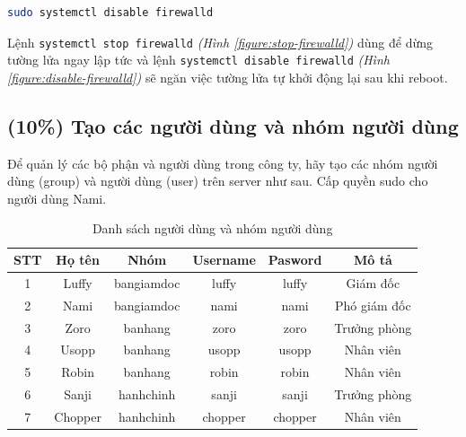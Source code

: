 \documentclass[a4paper, 11pt]{article}
\begin{document}
\begin{itemize}
          \begin{lstlisting}[language=bash, caption=Ngăn tường lửa tự khởi động lại]
sudo systemctl disable firewalld
\end{lstlisting}

          Lệnh \texttt{systemctl stop firewalld} \textit{(Hình \ref{figure:stop-firewalld})} dùng để dừng tường lửa ngay lập tức và lệnh \texttt{systemctl disable firewalld} \textit{(Hình \ref{figure:disable-firewalld})} sẽ ngăn việc tường lửa tự khởi động lại sau khi reboot.
\end{itemize}

\subsection{(10\%) Tạo các người dùng và nhóm người dùng}

Để quản lý các bộ phận và người dùng trong công ty, hãy tạo các nhóm người dùng (group) và người dùng (user) trên server như sau. Cấp quyền sudo cho người dùng Nami.

\begin{longtable}{|c|c|c|c|c|c|}
    \caption{Danh sách người dùng và nhóm người dùng}              \\
    \hline
    STT & Họ tên  & Nhóm       & Username & Pasword & Mô tả        \\
    \hline

    1   & Luffy   & bangiamdoc & luffy    & luffy   & Giám đốc     \\
    \hline

    2   & Nami    & bangiamdoc & nami     & nami    & Phó giám đốc \\
    \hline

    3   & Zoro    & banhang    & zoro     & zoro    & Trưởng phòng \\
    \hline

    4   & Usopp   & banhang    & usopp    & usopp   & Nhân viên    \\
    \hline

    5   & Robin   & banhang    & robin    & robin   & Nhân viên    \\
    \hline

    6   & Sanji   & hanhchinh  & sanji    & sanji   & Trưởng phòng \\
    \hline

    7   & Chopper & hanhchinh  & chopper  & chopper & Nhân viên    \\
    \hline
\end{longtable}
\end{document}
